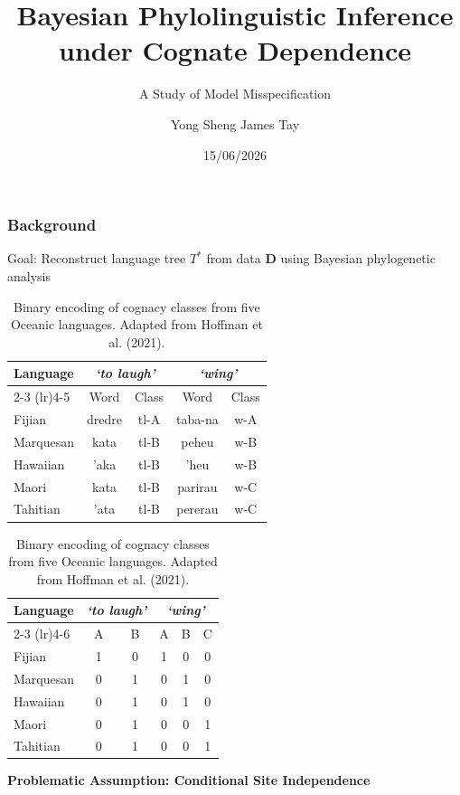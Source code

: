 \documentclass[
	aspectratio=169, %
	t, %
	onlytextwidth, %
	10pt, %
]{beamer}
\title{Bayesian Phylolinguistic Inference under
Cognate Dependence} %
\subtitle{A Study of Model
Misspecification} %
\author{Yong Sheng James Tay} %
\date{15/06/2026} %
\begin{document}

\begin{frame}
	\frametitle{Background}
    Goal: Reconstruct language tree $T^*$ from data $\mathbf{D}$ using Bayesian phylogenetic analysis
\begin{table}[h]
  \centering
  \begin{minipage}{0.55\textwidth}
    \centering
    \begin{tabular}{lcc|cc}
      \toprule
      \multirow{2}{*}{Language} & \multicolumn{2}{c}{\textit{`to laugh'}} & \multicolumn{2}{c}{\textit{`wing'}} \\
      \cmidrule(lr){2-3} \cmidrule(lr){4-5}
      & Word & Class & Word & Class \\
      \midrule
      Fijian & dredre & tl-A & taba-na & w-A \\
      Marquesan & kata & tl-B & peheu & w-B \\
      Hawaiian & 'aka & tl-B & 'heu & w-B \\
      Maori & kata & tl-B & parirau & w-C \\
      Tahitian & 'ata & tl-B & pererau & w-C \\
      \bottomrule
    \end{tabular}
  \end{minipage}
  \hfill
  \begin{minipage}{0.40\textwidth}
    \centering
    \begin{tabular}{l|ccccc}
      \toprule
      \multirow{2}{*}{Language} & \multicolumn{2}{c}{\textit{`to laugh'}} & \multicolumn{3}{c}{\textit{`wing'}} \\
      \cmidrule(lr){2-3} \cmidrule(lr){4-6}
      & A & B & A & B & C \\
      \midrule
      Fijian & 1 & 0 & 1 & 0 & 0 \\
      Marquesan & 0 & 1 & 0 & 1 & 0 \\
      Hawaiian & 0 & 1 & 0 & 1 & 0 \\
      Maori & 0 & 1 & 0 & 0 & 1 \\
      Tahitian & 0 & 1 & 0 & 0 & 1 \\
      \bottomrule
    \end{tabular}
  \end{minipage}
  
  \caption{Binary encoding of cognacy classes from five Oceanic languages. Adapted from Hoffman et al. (2021).}
  \label{tab:cognatedefinition}
\end{table}
    \textbf{Problematic Assumption: Conditional Site Independence}
\end{frame}
\end{document}
